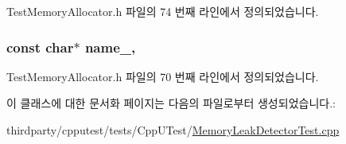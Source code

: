 Test\+Memory\+Allocator.\+h 파일의 74 번째 라인에서 정의되었습니다.

\subsubsection[{\texorpdfstring{name\+\_\+}{name_}}]{\setlength{\rightskip}{0pt plus 5cm}const char$\ast$ name\+\_\+\hspace{0.3cm}{\ttfamily [protected]}, {\ttfamily [inherited]}}\hypertarget{class_test_memory_allocator_a7dac8366c11fbcad2f49d85fe8fc4fbe}{}\label{class_test_memory_allocator_a7dac8366c11fbcad2f49d85fe8fc4fbe}


Test\+Memory\+Allocator.\+h 파일의 70 번째 라인에서 정의되었습니다.



이 클래스에 대한 문서화 페이지는 다음의 파일로부터 생성되었습니다.\+:\begin{DoxyCompactItemize}
\item 
thirdparty/cpputest/tests/\+Cpp\+U\+Test/\hyperlink{_memory_leak_detector_test_8cpp}{Memory\+Leak\+Detector\+Test.\+cpp}\end{DoxyCompactItemize}
